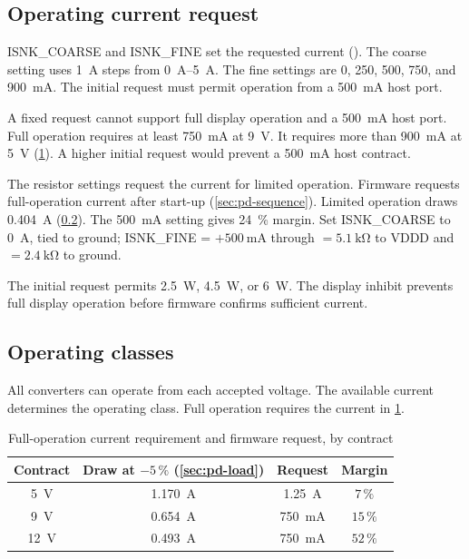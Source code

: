 \subsection{Operating current request}\label{sec:pd-isnk}

ISNK\_COARSE and ISNK\_FINE set the requested current
(). The coarse setting
uses \SI{1}{\ampere} steps from \SIrange{0}{5}{\ampere}. The fine settings are
\SI{0}{}, \SI{250}{}, \SI{500}{}, \SI{750}{}, and
\SI{900}{\milli\ampere}. The initial request must permit operation from a
\SI{500}{\milli\ampere} host port.

A fixed request cannot support full display operation and a
\SI{500}{\milli\ampere} host port. Full operation requires at least
\SI{750}{\milli\ampere} at \SI{9}{\volt}. It requires more than
\SI{900}{\milli\ampere} at \SI{5}{\volt} (\cref{tab:pd-required}). A higher
initial request would prevent a \SI{500}{\milli\ampere} host contract.

The resistor settings request the current for limited operation. Firmware
requests full-operation current after start-up (\cref{sec:pd-sequence}).
Limited operation draws \SI{0.404}{\ampere} (\cref{sec:pd-classes}). The
\SI{500}{\milli\ampere} setting gives \SI{24}{\percent} margin. Set
ISNK\_COARSE to
\SI{0}{\ampere}, tied to ground; ISNK\_FINE = $+\SI{500}{\milli\ampere}$
through  $= \SI{5.1}{\kilo\ohm}$ to VDDD and  $=
\SI{2.4}{\kilo\ohm}$ to ground.

The initial request permits \SI{2.5}{\watt}, \SI{4.5}{\watt}, or
\SI{6}{\watt}. The display inhibit prevents full display operation before
firmware confirms sufficient current.

\subsection{Operating classes}\label{sec:pd-classes}

All converters can operate from each accepted voltage. The available current
determines the operating class. Full operation requires the current in
\cref{tab:pd-required}.

\begin{table}[htbp]
\centering
\caption{Full-operation current requirement and firmware request, by
contract}\label{tab:pd-required}
\begin{tabular}{|c|c|c|c|}
\hline
\textbf{Contract} & \textbf{Draw at $-5\,\%$ (\cref{sec:pd-load})} &
\textbf{Request} & \textbf{Margin} \\
\hline
\SI{5}{\volt} & \SI{1.170}{\ampere} & \SI{1.25}{\ampere} & $7\,\%$ \\
\hline
\SI{9}{\volt} & \SI{0.654}{\ampere} & \SI{750}{\milli\ampere} & $15\,\%$ \\
\hline
\SI{12}{\volt} & \SI{0.493}{\ampere} & \SI{750}{\milli\ampere} & $52\,\%$ \\
\hline
\end{tabular}
\end{table}

